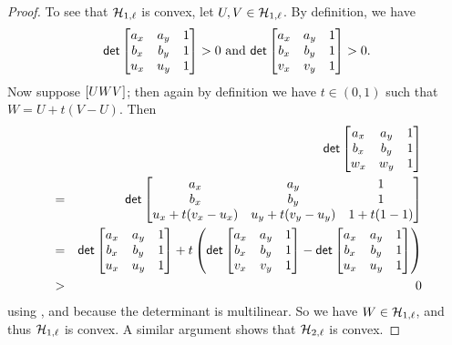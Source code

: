 \begin{proof}
To see that \(\mathcal{H}_{1,\ell}\) is convex, let \(U,V \in \mathcal{H}_{1,\ell}\).
By definition, we have \[ \mathsf{det} \begin{bmatrix} a_x & a_y & 1 \\ b_x & b_y & 1 \\ u_x & u_y & 1 \end{bmatrix} > 0\ \mathrm{and}\ \mathsf{det} \begin{bmatrix} a_x & a_y & 1 \\ b_x & b_y & 1 \\ v_x & v_y & 1 \end{bmatrix} > 0. \]
Now suppose \([ U W V ]\); then again by definition we have \(t \in (0,1)\) such that \(W = U + t(V-U)\).
Then
\begin{eqnarray*}
 & & \mathsf{det} \begin{bmatrix} a_x & a_y & 1 \\ b_x & b_y & 1 \\ w_x & w_y & 1 \end{bmatrix} \\
 & = & \mathsf{det} \begin{bmatrix} a_x & a_y & 1 \\ b_x & b_y & 1 \\ u_x + t(v_x - u_x) & u_y + t(v_y - u_y) & 1 + t(1 - 1) \end{bmatrix} \\
 & = & \mathsf{det} \begin{bmatrix} a_x & a_y & 1 \\ b_x & b_y & 1 \\ u_x & u_y & 1 \end{bmatrix} + t \left( \mathsf{det} \begin{bmatrix} a_x & a_y & 1 \\ b_x & b_y & 1 \\ v_x & v_y & 1 \end{bmatrix} - \mathsf{det} \begin{bmatrix} a_x & a_y & 1 \\ b_x & b_y & 1 \\ u_x & u_y & 1 \end{bmatrix} \right) \\
 & > & 0
\end{eqnarray*}
using , and because the determinant is multilinear.
So we have \(W \in \mathcal{H}_{1,\ell}\), and thus \(\mathcal{H}_{1,\ell}\) is convex.
A similar argument shows that \(\mathcal{H}_{2,\ell}\) is convex.
\end{proof}

